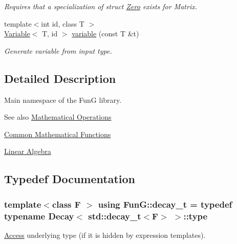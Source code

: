 \begin{DoxyCompactItemize}
\begin{DoxyCompactList}\small\item\em Requires that a specialization of struct \hyperlink{structFunG_1_1Zero}{Zero} exists for Matrix. \end{DoxyCompactList}\item 
{\footnotesize template$<$int id, class T $>$ }\\\hyperlink{structFunG_1_1Variable}{Variable}$<$ T, id $>$ \hyperlink{namespaceFunG_a1c474456411f028e14eab67ff6eebe0c}{variable} (const T \&t)
\begin{DoxyCompactList}\small\item\em Generate variable from input type. \end{DoxyCompactList}\end{DoxyCompactItemize}


\subsection{Detailed Description}
Main namespace of the FunG library. 

\begin{DoxySeeAlso}{See also}
\hyperlink{group__MathematicalOperationsGroup}{Mathematical Operations} 

\hyperlink{group__CMathGroup}{Common Mathematical Functions} 

\hyperlink{group__LinearAlgebraGroup}{Linear Algebra} 
\end{DoxySeeAlso}


\subsection{Typedef Documentation}
\subsubsection[{\texorpdfstring{decay\+\_\+t}{decay_t}}]{\setlength{\rightskip}{0pt plus 5cm}template$<$class F $>$ using {\bf Fun\+G\+::decay\+\_\+t} = typedef typename {\bf Decay}$<$ std\+::decay\+\_\+t$<$F$>$ $>$\+::type}\hypertarget{namespaceFunG_a195ac37d8696970c89b112c81a1e4d6e}{}\label{namespaceFunG_a195ac37d8696970c89b112c81a1e4d6e}


\hyperlink{namespaceFunG_1_1Access}{Access} underlying type (if it is hidden by expression templates). 

